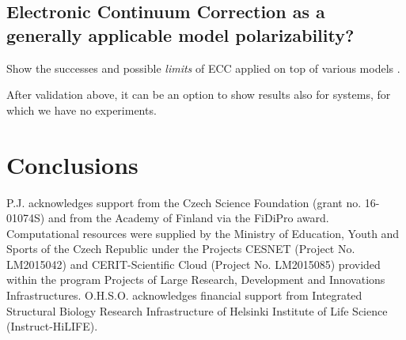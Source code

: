 \documentclass[journal=jpcbfk,manuscript=article]{achemso}
\begin{document}
 

\subsection{Electronic Continuum Correction as a generally applicable model polarizability?}

Show the successes and possible \emph{limits} of ECC applied on top of various models \cite{melcr18, martinek17, Pluharova2014, kohagen14, kohagen16}. 

After validation above, it can be an option to show results also for systems, for which we have no experiments. 

 
 
 
 
 
\section{Conclusions} 

 
 
 
\begin{acknowledgement} 
P.J. acknowledges support from the Czech Science Foundation (grant no. 16-01074S)  
and from the Academy of Finland via the FiDiPro award. 
Computational resources were supplied by the Ministry of Education, Youth and Sports 
of the Czech Republic under the Projects CESNET (Project No. LM2015042) and CERIT-Scientific 
Cloud (Project No. LM2015085) provided within the program Projects of Large Research, 
Development and Innovations Infrastructures. 
O.H.S.O. acknowledges financial support from 
Integrated Structural Biology Research Infrastructure of 
Helsinki Institute of Life Science (Instruct-HiLIFE). 
\end{acknowledgement} 
 
\begin{suppinfo} 
 
 
 
\end{suppinfo} 
 
 
 
 
\end{document}
